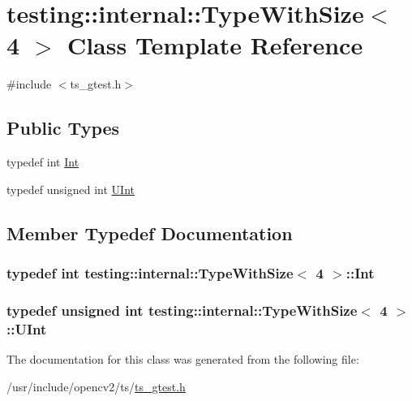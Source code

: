 \hypertarget{classtesting_1_1internal_1_1TypeWithSize_3_014_01_4}{\section{testing\-:\-:internal\-:\-:Type\-With\-Size$<$ 4 $>$ Class Template Reference}
\label{classtesting_1_1internal_1_1TypeWithSize_3_014_01_4}
}


{\ttfamily \#include $<$ts\-\_\-gtest.\-h$>$}

\subsection*{Public Types}
\begin{DoxyCompactItemize}
\item 
typedef int \hyperlink{classtesting_1_1internal_1_1TypeWithSize_3_014_01_4_a80351860c00ed665e73f952143f4484a}{Int}
\item 
typedef unsigned int \hyperlink{classtesting_1_1internal_1_1TypeWithSize_3_014_01_4_a7d559570f830bf35d095eeb94d98de58}{U\-Int}
\end{DoxyCompactItemize}


\subsection{Member Typedef Documentation}
\hypertarget{classtesting_1_1internal_1_1TypeWithSize_3_014_01_4_a80351860c00ed665e73f952143f4484a}{
\subsubsection[{Int}]{\setlength{\rightskip}{0pt plus 5cm}typedef int {\bf testing\-::internal\-::\-Type\-With\-Size}$<$ 4 $>$\-::{\bf Int}}}\label{classtesting_1_1internal_1_1TypeWithSize_3_014_01_4_a80351860c00ed665e73f952143f4484a}
\hypertarget{classtesting_1_1internal_1_1TypeWithSize_3_014_01_4_a7d559570f830bf35d095eeb94d98de58}{
\subsubsection[{U\-Int}]{\setlength{\rightskip}{0pt plus 5cm}typedef unsigned int {\bf testing\-::internal\-::\-Type\-With\-Size}$<$ 4 $>$\-::{\bf U\-Int}}}\label{classtesting_1_1internal_1_1TypeWithSize_3_014_01_4_a7d559570f830bf35d095eeb94d98de58}


The documentation for this class was generated from the following file\-:\begin{DoxyCompactItemize}
\item 
/usr/include/opencv2/ts/\hyperlink{ts__gtest_8h}{ts\-\_\-gtest.\-h}\end{DoxyCompactItemize}
